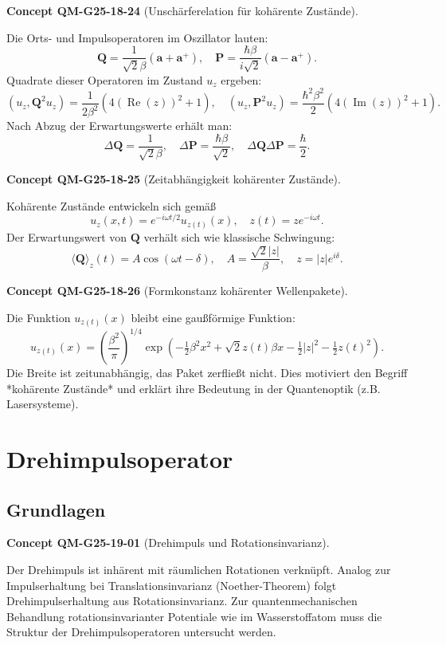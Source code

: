 \documentclass[10pt, letterpaper]{article}
\newcommand{\CustomHeading}[3]{%
  \par\medskip\noindent%
  \textbf{#1 #2} \textnormal{(#3)}.\enskip%
}
\newenvironment{CONC}[2]{\CustomHeading{Concept}{#1}{#2}}{}
\begin{document}
\begin{CONC}{QM-G25-18-24}{Unschärferelation für kohärente Zustände}
Die Orts- und Impulsoperatoren im Oszillator lauten:
\[
\mathbf{Q} = \frac{1}{\sqrt{2}\beta}(\mathbf{a} + \mathbf{a}^+), \quad \mathbf{P} = \frac{\hbar\beta}{i\sqrt{2}}(\mathbf{a} - \mathbf{a}^+).
\]
Quadrate dieser Operatoren im Zustand $u_z$ ergeben:
\[
\left(u_z, \mathbf{Q}^2 u_z \right) = \frac{1}{2\beta^2} \left( 4 (\operatorname{Re}(z))^2 + 1 \right), \quad
\left(u_z, \mathbf{P}^2 u_z \right) = \frac{\hbar^2 \beta^2}{2} \left( 4 (\operatorname{Im}(z))^2 + 1 \right).
\]
Nach Abzug der Erwartungswerte erhält man:
\[
\Delta \mathbf{Q} = \frac{1}{\sqrt{2}\beta}, \quad \Delta \mathbf{P} = \frac{\hbar \beta}{\sqrt{2}}, \quad \Delta \mathbf{Q} \Delta \mathbf{P} = \frac{\hbar}{2}.
\]
\end{CONC}

\begin{CONC}{QM-G25-18-25}{Zeitabhängigkeit kohärenter Zustände}
Kohärente Zustände entwickeln sich gemäß
\[
u_z(x,t) = e^{-i \omega t/2} u_{z(t)}(x), \quad z(t) = z e^{-i \omega t}.
\]
Der Erwartungswert von $\mathbf{Q}$ verhält sich wie klassische Schwingung:
\[
\langle \mathbf{Q} \rangle_z(t) = A \cos(\omega t - \delta), \quad A = \frac{\sqrt{2} |z|}{\beta}, \quad z = |z| e^{i\delta}.
\]
\end{CONC}

\begin{CONC}{QM-G25-18-26}{Formkonstanz kohärenter Wellenpakete}
Die Funktion $u_{z(t)}(x)$ bleibt eine gaußförmige Funktion:
\[
u_{z(t)}(x) = \left( \frac{\beta^2}{\pi} \right)^{1/4} \exp\left( -\tfrac{1}{2} \beta^2 x^2 + \sqrt{2} z(t) \beta x - \tfrac{1}{2}|z|^2 - \tfrac{1}{2} z(t)^2 \right).
\]
Die Breite ist zeitunabhängig, das Paket zerfließt nicht. Dies motiviert den Begriff *kohärente Zustände* und erklärt ihre Bedeutung in der Quantenoptik (z.B. Lasersysteme).
\end{CONC}

\section{Drehimpulsoperator}

\subsection{Grundlagen}

\begin{CONC}{QM-G25-19-01}{Drehimpuls und Rotationsinvarianz}
Der Drehimpuls ist inhärent mit räumlichen Rotationen verknüpft. Analog zur Impulserhaltung bei Translationsinvarianz (Noether-Theorem) folgt Drehimpulserhaltung aus Rotationsinvarianz. Zur quantenmechanischen Behandlung rotationsinvarianter Potentiale wie im Wasserstoffatom muss die Struktur der Drehimpulsoperatoren untersucht werden.
\end{CONC}
\end{document}
